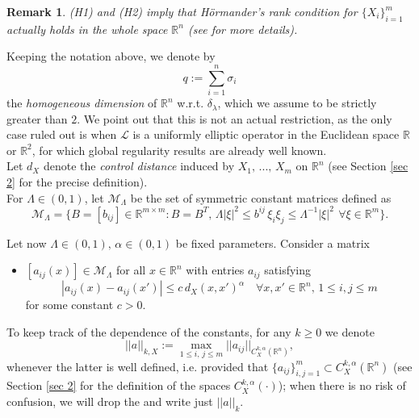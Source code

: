 \documentclass{article}
\newtheorem{remark}[theorem]{Remark}
\numberwithin{equation}{section}
\begin{document}
\vspace{2mm}

\begin{remark}
    (H1) and (H2) imply that
    Hörmander's rank condition for $\{X_i\}_{i=1}^m$ actually holds in the whole space $\mathbb{R}^n$ (see \cite[Remark 3.2]{global est fund sol hom Horm op} for more details).
\end{remark}

\vspace{2mm}

Keeping the notation above, we denote by 
\begin{equation*}
    q := \sum_{i=1}^n \sigma_i
\end{equation*} 
the \emph{homogeneous dimension} of $\mathbb{R}^n$ w.r.t. $\delta_{\lambda}$, which we assume to be strictly greater than $2$. We point out that this is not an actual restriction, as the only case ruled out is when $\mathcal{L}$ is a uniformly elliptic operator in the Euclidean space $\mathbb{R}$ or $\mathbb{R}^2$, for which global regularity results are already well known.\\
Let $d_X$ denote the \emph{control distance} induced by $X_1, \, ..., \, X_m$ on $\mathbb{R}^n$ (see Section \ref{sec 2} for the precise definition).
\\For $\Lambda \in (0,1)$, let $\mathcal{M}_{\Lambda}$ be the set of symmetric constant matrices defined as
\begin{equation*}
    \mathcal{M}_{\Lambda} = \{B=[b_{ij}] \in \mathbb{R}^{m \times m}: B=B^T, \, \Lambda |\xi|^2 \leq  b^{ij}\, \xi_i \xi_j \leq \Lambda^{-1} |\xi|^2 \:\, \forall \xi \in \mathbb{R}^m\}.
\end{equation*}

\hspace{-7mm} Let now $\Lambda \in (0,1), \, \alpha \in (0,1)$ be fixed parameters. Consider a matrix 
\begin{itemize}
    \item [(H3)] $[a_{ij}(x)] \in \mathcal{M}_{\Lambda}$ for all $x \in \mathbb{R}^n$ with entries $a_{ij}$ satisfying 
    \begin{equation*}
        |a_{ij}(x)-a_{ij}(x')| \leq c \, d_X(x,x')^{\alpha} \quad \forall x,x' \in \mathbb{R}^n, \, 1 \leq i,j \leq m
    \end{equation*}
    for some constant $c>0$.
\end{itemize}
To keep track of the dependence of the constants, for any $k \geq 0$ we denote
\begin{equation*}
    ||a||_{k,X}:=\max_{1 \leq i,\, j \leq m} ||a_{ij}||_{C^{k,\alpha}_X(\mathbb{R}^n)},
\end{equation*}
whenever the latter is well defined, i.e. provided that $\{a_{ij}\}_{i,j=1}^m \subset C^{k,\alpha}_X(\mathbb{R}^n)$ (see Section \ref{sec 2} for the definition of the spaces $C^{k,\alpha}_X(\cdot)$); when there is no risk of confusion, we will drop the  and write just $||a||_k$.
\end{document}
